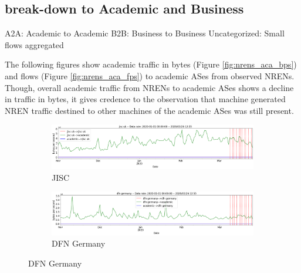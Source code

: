 \documentclass[10pt, journal, letterpaper]{IEEEtran}
\newcommand\linearFigSze{0.48}
\begin{document}
\subsection{break-down to Academic and Business}
A2A: Academic to Academic
B2B: Business to Business
Uncategorized: Small flows aggregated

The following figures show academic traffic in bytes (Figure \ref{fig:nrens_aca_bps}) and flows (Figure \ref{fig:nrens_aca_fps}) to academic ASes from observed NRENs. Though, overall academic traffic from NRENs to academic ASes shows a decline in traffic in bytes, it gives credence to the observation that machine generated NREN traffic destined to other machines of the academic ASes was still present.

\begin{figure}
    \begin{subfigure}{\linearFigSze\textwidth}
          \centering
          \includegraphics[width=\columnwidth]{img/jisc_aca_bps.png}
          \caption{JISC}
          \label{fig:jisc_aca_bps}
    \end{subfigure}
    \begin{subfigure}{\linearFigSze\textwidth}
          \centering
          \includegraphics[width=\columnwidth]{img/dfn_aca_bps.png}
          \caption{DFN Germany}

\end{subfigure}
\end{figure}
\end{document}
